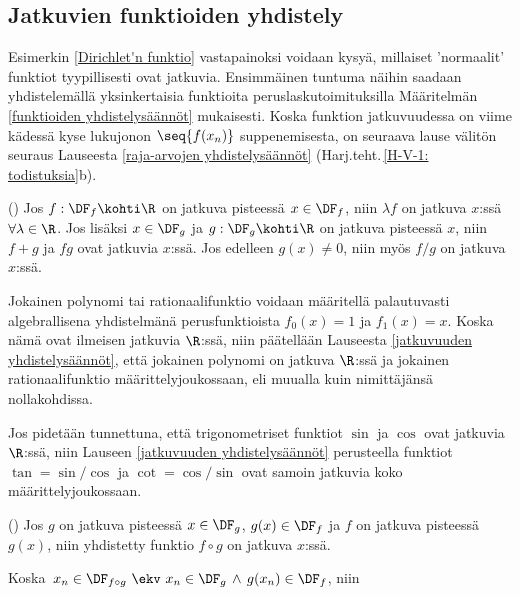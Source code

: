 \subsection{Jatkuvien funktioiden yhdistely}

Esimerkin \ref{Dirichlet'n funktio} vastapainoksi voidaan kysyä, millaiset 'normaalit' funktiot 
tyypillisesti ovat jatkuvia. Ensimmäinen tuntuma näihin saadaan yhdistelemällä yksinkertaisia 
funktioita peruslaskutoimituksilla Määritelmän \ref{funktioiden yhdistelysäännöt} mukaisesti.
Koska funktion jatkuvuudessa on viime kädessä kyse lukujonon $\seq{f(x_n)}$ suppenemisesta,
on seuraava lause välitön seuraus Lauseesta \ref{raja-arvojen yhdistelysäännöt}
(Harj.teht.\,\ref{H-V-1: todistuksia}b).
\begin{Lause} () \label{jatkuvuuden yhdistelysäännöt}
Jos $f:\DF_f\kohti\R$ on jatkuva pisteessä $x\in\DF_f$, niin $\lambda f$ on jatkuva $x$:ssä 
$\forall\lambda\in\R$. Jos lisäksi $x\in\DF_g$ ja $g:\DF_g\kohti\R$ on jatkuva pisteessä $x$,
niin $f+g$ ja $fg$ ovat jatkuvia $x$:ssä. Jos edelleen $g(x)\neq 0$, niin myös $f/g$ on
jatkuva $x$:ssä.
\end{Lause}
\begin{Exa} Jokainen polynomi tai rationaalifunktio voidaan määritellä palautuvasti
algebrallisena yhdistelmänä perusfunktioista $f_0(x)=1$ ja $f_1(x)=x$. Koska nämä ovat
ilmeisen jatkuvia $\R$:ssä, niin päätellään Lauseesta \ref{jatkuvuuden yhdistelysäännöt},
että jokainen polynomi on jatkuva $\R$:ssä ja jokainen rationaalifunktio
määrittelyjoukossaan, eli muualla kuin nimittäjänsä nollakohdissa. \loppu 
\end{Exa}
\begin{Exa} \label{trig yhdistely} Jos pidetään tunnettuna, että trigonometriset funktiot
$\sin$ ja $\cos$ ovat jatkuvia $\R$:ssä, niin Lauseen \ref{jatkuvuuden yhdistelysäännöt}
perusteella funktiot $\tan=\sin/\cos$ ja $\cot=\cos/\sin$ ovat samoin jatkuvia koko
määrittelyjoukossaan. \loppu 
\end{Exa}
\begin{Lause} () \label{yhdistetyn funktion jatkuvuus}
Jos $g$ on jatkuva pisteessä $x\in\DF_g$, $g(x)\in\DF_f$ ja $f$ on jatkuva pisteessä $g(x)$,
niin yhdistetty funktio $f\circ g$ on jatkuva $x$:ssä.
\end{Lause}
\tod Koska $\,x_n\in\DF_{f \circ g}\ \ekv\ x_n\in\DF_g\,\wedge\,g(x_n)\in\DF_f$, niin

